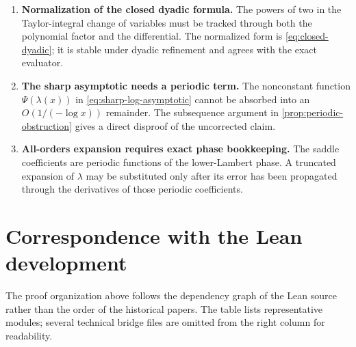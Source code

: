 \documentclass[11pt,oneside]{article}
\theoremstyle{definition}
\theoremstyle{remark}
\newcommand{\Lam}{\lambda}
\newcommand{\PsiPer}{\Psi}
\begin{document}
\begin{enumerate}
\item \textbf{Normalization of the closed dyadic formula.}
The powers of two in the Taylor-integral change of variables must be tracked
through both the polynomial factor and the differential.  The normalized form is
\eqref{eq:closed-dyadic}; it is stable under dyadic refinement and agrees with the
exact evaluator.

\item \textbf{The sharp asymptotic needs a periodic term.}
The nonconstant function $\PsiPer(\Lam(x))$ in
\eqref{eq:sharp-log-asymptotic} cannot be absorbed into an
$O(1/(-\log x))$ remainder.  The subsequence argument in
\cref{prop:periodic-obstruction} gives a direct disproof of the uncorrected claim.

\item \textbf{All-orders expansion requires exact phase bookkeeping.}
The saddle coefficients are periodic functions of the lower-Lambert phase.  A
truncated expansion of $\Lam$ may be substituted only after its error has been
propagated through the derivatives of those periodic coefficients.
\end{enumerate}

\appendix

\section{Correspondence with the Lean development}\label{app:Lean-map}

The proof organization above follows the dependency graph of the Lean source rather
than the order of the historical papers.  The table lists representative modules;
several technical bridge files are omitted from the right column for readability.
\end{document}
